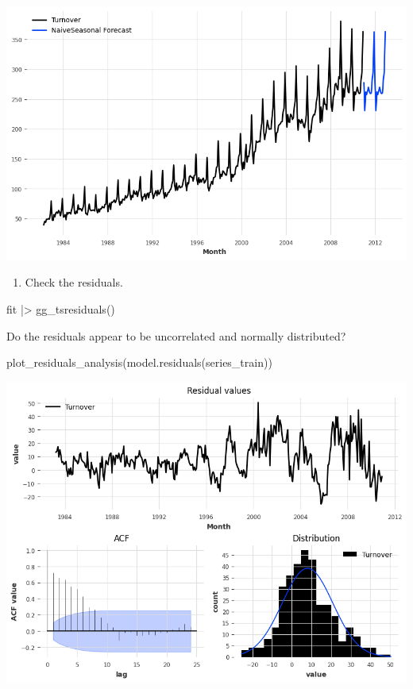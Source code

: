 \documentclass[
  11pt,
]{article}
\newenvironment{Shaded}{\begin{snugshade}}{\end{snugshade}}
\newcommand{\NormalTok}[1]{\textcolor[rgb]{0.00,0.23,0.31}{#1}}
\providecommand{\tightlist}{%
  \setlength{\itemsep}{0pt}\setlength{\parskip}{0pt}}\usepackage{longtable,booktabs,array}
\begin{document}
\includegraphics{hw3_files/figure-pdf/cell-53-output-1.png}

\begin{enumerate}
\def\labelenumi{\alph{enumi}.}
\setcounter{enumi}{3}
\tightlist
\item
  Check the residuals.
\end{enumerate}

\begin{Shaded}
\begin{Highlighting}[]
\NormalTok{fit |\textgreater{} gg\_tsresiduals()}
\end{Highlighting}
\end{Shaded}

Do the residuals appear to be uncorrelated and normally distributed?

\begin{Shaded}
\begin{Highlighting}[]
\NormalTok{plot\_residuals\_analysis(model.residuals(series\_train))}
\end{Highlighting}
\end{Shaded}

\includegraphics{hw3_files/figure-pdf/cell-54-output-1.png}
\end{document}
